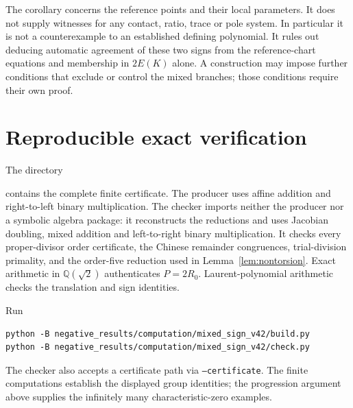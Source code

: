 \documentclass[11pt,a4paper]{article}
\newcommand{\Q}{\mathbb Q}\newcommand{\Z}{\mathbb Z}\newcommand{\F}{\mathbb F}
\begin{document}
The corollary concerns the reference points and their local parameters.
It does not supply witnesses for any contact, ratio, trace or pole
system. In particular it is not a counterexample to an established
defining polynomial. It rules out deducing automatic agreement of these
two signs from the reference-chart equations and membership in $2E(K)$
alone. A construction may impose further conditions that exclude or
control the mixed branches; those conditions require their own proof.

\section{Reproducible exact verification}
The directory
\begin{center}\small
{}
\end{center}
contains the complete finite certificate. The producer uses affine
addition and right-to-left binary multiplication. The checker imports
neither the producer nor a symbolic algebra package: it reconstructs the
reductions and uses Jacobian doubling, mixed addition and left-to-right
binary multiplication. It checks every proper-divisor order certificate,
the Chinese remainder congruences, trial-division primality, and the
order-five reduction used in Lemma~\ref{lem:nontorsion}. Exact arithmetic
in $\Q(\sqrt2)$ authenticates $P=2R_0$. Laurent-polynomial arithmetic
checks the translation and sign identities.

Run
\begin{verbatim}
python -B negative_results/computation/mixed_sign_v42/build.py
python -B negative_results/computation/mixed_sign_v42/check.py
\end{verbatim}
The checker also accepts a certificate path via \texttt{--certificate}.
The finite computations establish the displayed group identities;
the progression argument above supplies the infinitely many
characteristic-zero examples.
\end{document}
